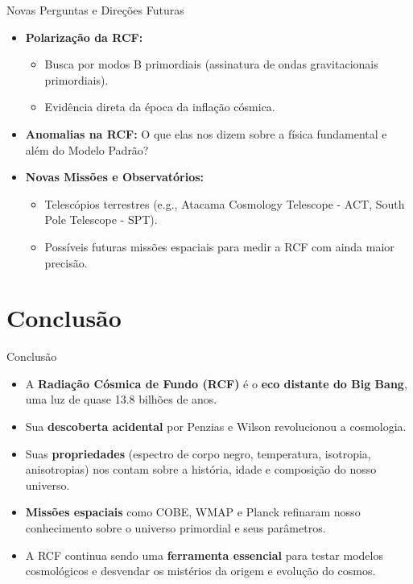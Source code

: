 \documentclass{beamer}
\begin{document}
\begin{frame}{Novas Perguntas e Direções Futuras}
    \begin{itemize}
        \item \textbf{Polarização da RCF:}
        \begin{itemize}
            \item Busca por modos B primordiais (assinatura de ondas gravitacionais primordiais).
            \item Evidência direta da época da inflação cósmica.
        \end{itemize}
        \item \textbf{Anomalias na RCF:} O que elas nos dizem sobre a física fundamental e além do Modelo Padrão?
        \item \textbf{Novas Missões e Observatórios:}
        \begin{itemize}
            \item Telescópios terrestres (e.g., Atacama Cosmology Telescope - ACT, South Pole Telescope - SPT).
            \item Possíveis futuras missões espaciais para medir a RCF com ainda maior precisão.
        \end{itemize}
    \end{itemize}
\end{frame}

\section{Conclusão}

\begin{frame}{Conclusão}
    \begin{itemize}
        \item A \textbf{Radiação Cósmica de Fundo (RCF)} é o \textbf{eco distante do Big Bang}, uma luz de quase 13.8 bilhões de anos.
        \item Sua \textbf{descoberta acidental} por Penzias e Wilson revolucionou a cosmologia.
        \item Suas \textbf{propriedades} (espectro de corpo negro, temperatura, isotropia, anisotropias) nos contam sobre a história, idade e composição do nosso universo.
        \item \textbf{Missões espaciais} como COBE, WMAP e Planck refinaram nosso conhecimento sobre o universo primordial e seus parâmetros.
        \item A RCF continua sendo uma \textbf{ferramenta essencial} para testar modelos cosmológicos e desvendar os mistérios da origem e evolução do cosmos.
    \end{itemize}
\end{frame}
\end{document}
